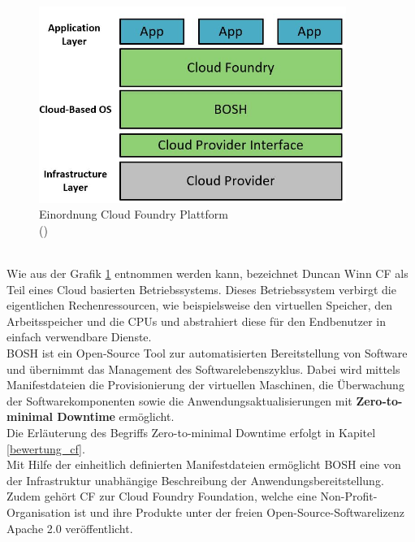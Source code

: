 \begin{figure}[h]
	\begin{center}
		\includegraphics[width=10cm]{img/Cloud_Foundry_Layers.JPG}
		\caption[Einordnung Cloud Foundry Plattform]{Einordnung Cloud Foundry Plattform\\
			(\cite[Eigene Abbildung in Anlehnung an][S. 9]{Winn.2017})}
		\label{Cloud_Foundry_Layers}
	\end{center}
\end{figure}
\\
Wie aus der Grafik \ref{Cloud_Foundry_Layers} entnommen werden kann, bezeichnet Duncan Winn \ac{CF} als Teil eines Cloud basierten Betriebssystems. Dieses Betriebssystem verbirgt die eigentlichen Rechenressourcen, wie beispielsweise den virtuellen Speicher, den Arbeitsspeicher und die \acsp{CPU} und abstrahiert diese für den Endbenutzer in einfach verwendbare Dienste.\autocite[Vgl.][S. 8]{Winn.2017}\\
BOSH ist ein Open-Source Tool zur automatisierten Bereitstellung von Software und übernimmt das Management des Softwarelebenszyklus. Dabei wird mittels Manifestdateien die Provisionierung der virtuellen Maschinen, die Überwachung der Softwarekomponenten sowie die Anwendungsaktualisierungen mit \textbf{Zero-to-minimal Downtime} ermöglicht. \\
Die Erläuterung des Begriffs Zero-to-minimal Downtime erfolgt in Kapitel \ref{bewertung_cf}.\\
Mit Hilfe der einheitlich definierten Manifestdateien ermöglicht BOSH eine von der Infrastruktur unabhängige Beschreibung der Anwendungsbereitstellung.\autocite[Vgl.][S. 14-15]{Winn.2017}
\\
Zudem gehört \ac{CF} zur Cloud Foundry Foundation, welche eine Non-Profit-Organisation ist und ihre Produkte unter der freien Open-Source-Softwarelizenz Apache 2.0 veröffentlicht.\autocite[Vgl.][]{GitHubRepositoryCloudFoundry.2020}

